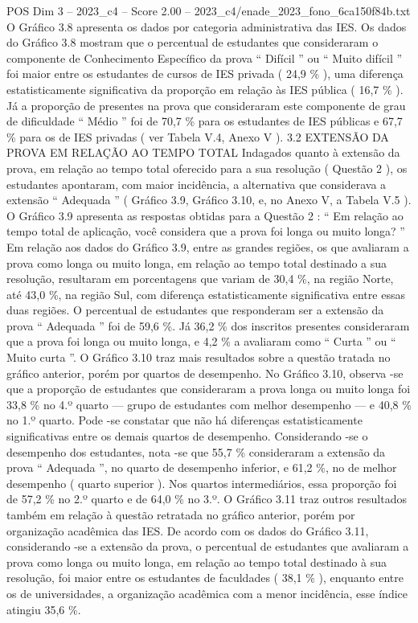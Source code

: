 \begin{textsample}{POS Dim 3 – 2023\_c4 – Score 2.00 – 2023\_c4/enade\_2023\_fono\_6ca150f84b.txt}
O Gráfico 3.8 apresenta os dados por categoria administrativa das IES.
Os dados do Gráfico 3.8 mostram que o percentual de estudantes que consideraram o componente de Conhecimento Específico da prova “ Difícil ” ou “ Muito difícil ” foi maior entre os estudantes de cursos de IES privada ( 24,9 \% ), uma diferença estatisticamente significativa da proporção em relação às IES pública ( 16,7 \% ).
Já a proporção de presentes na prova que consideraram este componente de grau de dificuldade “ Médio ” foi de 70,7 \% para os estudantes de IES públicas e 67,7 \% para os de IES privadas ( ver Tabela V.4, Anexo V ). 3.2 EXTENSÃO DA PROVA EM RELAÇÃO AO TEMPO TOTAL Indagados quanto à extensão da prova, em relação ao tempo total oferecido para a sua resolução ( Questão 2 ), os estudantes apontaram, com maior incidência, a alternativa que considerava a extensão “ Adequada ” ( Gráfico 3.9, Gráfico 3.10, e, no Anexo V, a Tabela V.5 ).
O Gráfico 3.9 apresenta as respostas obtidas para a Questão 2 : “ Em relação ao tempo total de aplicação, você considera que a prova foi longa ou muito longa? ” Em relação aos dados do Gráfico 3.9, entre as grandes regiões, os que avaliaram a prova como longa ou muito longa, em relação ao tempo total destinado a sua resolução, resultaram em porcentagens que variam de 30,4 \%, na região Norte, até 43,0 \%, na região Sul, com diferença estatisticamente significativa entre essas duas regiões.
O percentual de estudantes que responderam ser a extensão da prova “ Adequada ” foi de 59,6 \%.
Já 36,2 \% dos inscritos presentes consideraram que a prova foi longa ou muito longa, e 4,2 \% a avaliaram como “ Curta ” ou “ Muito curta ”.
O Gráfico 3.10 traz mais resultados sobre a questão tratada no gráfico anterior, porém por quartos de desempenho.
No Gráfico 3.10, observa -se que a proporção de estudantes que consideraram a prova longa ou muito longa foi 33,8 \% no 4.º quarto — grupo de estudantes com melhor desempenho — e 40,8 \% no 1.º quarto.
Pode -se constatar que não há diferenças estatisticamente significativas entre os demais quartos de desempenho.
Considerando -se o desempenho dos estudantes, nota -se que 55,7 \% consideraram a extensão da prova “ Adequada ”, no quarto de desempenho inferior, e 61,2 \%, no de melhor desempenho ( quarto superior ).
Nos quartos intermediários, essa proporção foi de 57,2 \% no 2.º quarto e de 64,0 \% no 3.º.
O Gráfico 3.11 traz outros resultados também em relação à questão retratada no gráfico anterior, porém por organização acadêmica das IES.
De acordo com os dados do Gráfico 3.11, considerando -se a extensão da prova, o percentual de estudantes que avaliaram a prova como longa ou muito longa, em relação ao tempo total destinado à sua resolução, foi maior entre os estudantes de faculdades ( 38,1 \% ), enquanto entre os de universidades, a organização acadêmica com a menor incidência, esse índice atingiu 35,6 \%.

\end{textsample}
